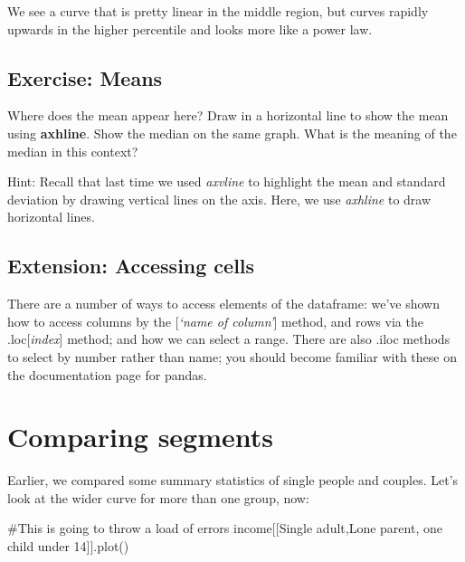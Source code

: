 \documentclass[
  letterpaper,
  DIV=11,
  numbers=noendperiod]{scrreprt}
\newenvironment{Shaded}{\begin{snugshade}}{\end{snugshade}}
\newcommand{\CommentTok}[1]{\textcolor[rgb]{0.37,0.37,0.37}{#1}}
\newcommand{\NormalTok}[1]{\textcolor[rgb]{0.00,0.23,0.31}{#1}}
\newcommand{\StringTok}[1]{\textcolor[rgb]{0.13,0.47,0.30}{#1}}
\begin{document}
We see a curve that is pretty linear in the middle region, but curves
rapidly upwards in the higher percentile and looks more like a power
law.

\hypertarget{exercise-means}{%
\subsection{Exercise: Means}\label{exercise-means}}

Where does the mean appear here? Draw in a horizontal line to show the
mean using \textbf{axhline}. Show the median on the same graph. What is
the meaning of the median in this context?

Hint: Recall that last time we used \emph{axvline} to highlight the mean
and standard deviation by drawing vertical lines on the axis. Here, we
use \emph{axhline} to draw horizontal lines.

\hypertarget{extension-accessing-cells}{%
\subsection{Extension: Accessing
cells}\label{extension-accessing-cells}}

There are a number of ways to access elements of the dataframe: we've
shown how to access columns by the {[}\emph{`name of column'}{]} method,
and rows via the .loc{[}\emph{index}{]} method; and how we can select a
range. There are also .iloc methods to select by number rather than
name; you should become familiar with these on the documentation page
for pandas.

\hypertarget{comparing-segments}{%
\section{Comparing segments}\label{comparing-segments}}

Earlier, we compared some summary statistics of single people and
couples. Let's look at the wider curve for more than one group, now:

\begin{Shaded}
\begin{Highlighting}[]
\CommentTok{\#This is going to throw a load of errors}
\NormalTok{income[[}\StringTok{\textquotesingle{}Single adult\textquotesingle{}}\NormalTok{,}\StringTok{\textquotesingle{}Lone parent, one child under 14\textquotesingle{}}\NormalTok{]].plot()}
\end{Highlighting}
\end{Shaded}
\end{document}
